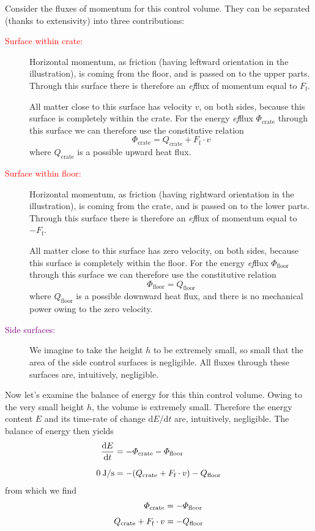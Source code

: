 \documentclass[a4paper,12pt,%
onecolumn,oneside,%
british%
]{memoir}
\newcommand*{\di}{\mathrm{d}}%
\renewcommand*{\|}[1][]{\nonscript\:#1\vert\nonscript\:\mathopen{}}
\newcommand*{\yE}{E}
\newcommand*{\yH}{\varPhi}%
\newcommand*{\yHfl}{\yH_{\text{floor}}}
\newcommand*{\yHc}{\yH_{\text{crate}}}
\newcommand*{\yQ}{Q}%
\newcommand*{\yQc}{\yQ_{\text{crate}}}
\newcommand*{\yQfl}{\yQ_{\text{floor}}}
\newcommand*{\yFf}{F_{\text{f}}}
\begin{document}
Consider the fluxes of momentum for this control volume. They can be separated (thanks to extensivity) into three contributions:
\begin{description}
\item[\textcolor{red}{Surface within crate:}] Horizontal momentum, as friction (having leftward orientation in the illustration), is coming from the floor, and is passed on to the upper parts. Through this surface there is therefore an \emph{ef}flux of momentum equal to $\yFf$.

All matter close to this surface has velocity $v$, on both sides, because this surface is completely within the crate. For the energy \emph{ef}flux  $\yHc$ through this surface we can therefore use the constitutive relation
\begin{equation*}
  \yHc = \yQc +\yFf\cdot v
\end{equation*}
where $\yQc$ is a possible upward heat flux.

\item[\textcolor{red}{Surface within floor:}] Horizontal momentum, as friction (having rightward orientation in the illustration), is coming from the crate, and is passed on to the lower parts. Through this surface there is therefore an \emph{ef}flux of momentum equal to $-\yFf$.

  All matter close to this surface has zero velocity, on both sides, because this surface is completely within the floor. For the energy \emph{ef}flux $\yHfl$ through this surface we can therefore use the constitutive relation
\begin{equation*}
  \yHfl = \yQfl
\end{equation*}
where $\yQfl$ is a possible downward heat flux, and there is no mechanical power owing to the zero velocity.

\item[\textcolor{purple}{Side surfaces:}] We imagine to take the height $h$ to be extremely small, so small that the area of the side control surfaces is negligible. All fluxes through these surfaces are, intuitively, negligible.
\end{description}

Now let's examine the balance of energy for this thin control volume. Owing to the very small height $h$, the volume is extremely small. Therefore the energy content $\yE$ and its time-rate of change $\di\yE/\di t$ are, intuitively, negligible. The balance of energy then yields
\begin{equation*}
  \begin{aligned}
    \frac{\di\yE}{\di t} &= -\yHc -\yHfl
    \\[2\jot]
    \qty{0}{J/s}&= - (\yQc + \yFf\cdot v) - \yQfl
  \end{aligned}
\end{equation*}
from which we find
\begin{equation*}
  \begin{aligned}
    \yHc &= -\yHfl \\[\jot]  \yQc + \yFf \cdot v &= -\yQfl
  \end{aligned}
\end{equation*}
\end{document}
